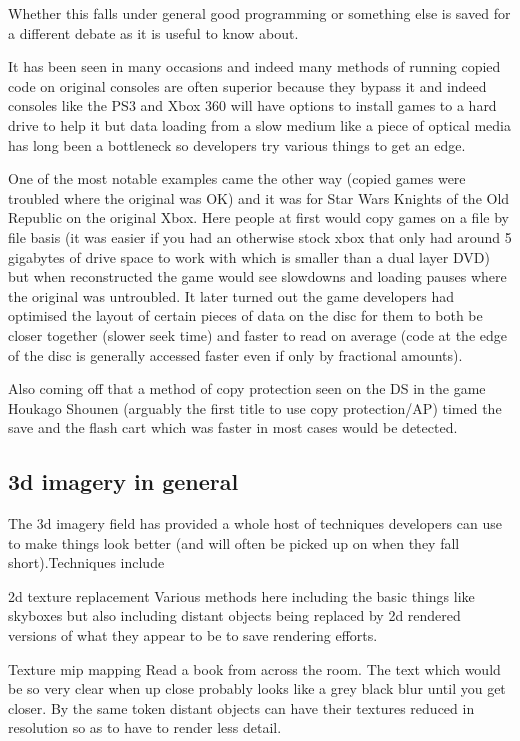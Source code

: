 \documentclass[
]{book}
\begin{document}
Whether this falls under general good programming or something else is saved for a different debate as it is useful to know about.

It has been seen in many occasions and indeed many methods of running copied code on original consoles are often superior because they bypass it and indeed consoles like the PS3 and Xbox 360 will have options to install games to a hard drive to help it but data loading from a slow medium like a piece of optical media has long been a bottleneck so developers try various things to get an edge.

One of the most notable examples came the other way (copied games were troubled where the original was OK) and it was for Star Wars Knights of the Old Republic on the original Xbox. Here people at first would copy games on a file by file basis (it was easier if you had an otherwise stock xbox that only had around 5 gigabytes of drive space to work with which is smaller than a dual layer DVD) but when reconstructed the game would see slowdowns and loading pauses where the original was untroubled. It later turned out the game developers had optimised the layout of certain pieces of data on the disc for them to both be closer together (slower seek time) and faster to read on average (code at the edge of the disc is generally accessed faster even if only by fractional amounts).

Also coming off that a method of copy protection seen on the DS in the game Houkago Shounen (arguably the first title to use copy protection/AP) timed the save and the flash cart which was faster in most cases would be detected.

\hypertarget{d-imagery-in-general}{%
\subsection{3d imagery in general}\label{d-imagery-in-general}}

The 3d imagery field has provided a whole host of techniques developers can use to make things look better (and will often be picked up on when they fall short).Techniques include

2d texture replacement Various methods here including the basic things like skyboxes but also including distant objects being replaced by 2d rendered versions of what they appear to be to save rendering efforts.

Texture mip mapping Read a book from across the room. The text which would be so very clear when up close probably looks like a grey black blur until you get closer. By the same token distant objects can have their textures reduced in resolution so as to have to render less detail.
\end{document}
